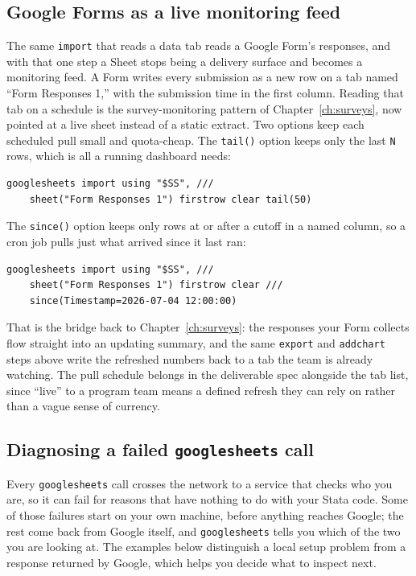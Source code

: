 \documentclass[
    a4paper,
    fontsize=10pt,
    twoside=true,
    numbers=noenddot,
]{kaobook}
\begin{document}
\subsection{Google Forms as a live monitoring feed}
The same \texttt{import} that reads a data tab reads a Google Form's responses, and with that one step a Sheet stops being a delivery surface and becomes a monitoring feed. A Form writes every submission as a new row on a tab named \enquote{Form Responses 1,} with the submission time in the first column. Reading that tab on a schedule is the survey-monitoring pattern of Chapter~\ref{ch:surveys}, now pointed at a live sheet instead of a static extract. Two options keep each scheduled pull small and quota-cheap. The \texttt{tail()} option keeps only the last \texttt{N} rows, which is all a running dashboard needs:
\par
{\footnotesize
\begin{verbatim}
googlesheets import using "$SS", ///
    sheet("Form Responses 1") firstrow clear tail(50)
\end{verbatim}
}
The \texttt{since()} option keeps only rows at or after a cutoff in a named column, so a cron job pulls just what arrived since it last ran:
\par
{\footnotesize
\begin{verbatim}
googlesheets import using "$SS", ///
    sheet("Form Responses 1") firstrow clear ///
    since(Timestamp=2026-07-04 12:00:00)
\end{verbatim}
}
That is the bridge back to Chapter~\ref{ch:surveys}: the responses your Form collects flow straight into an updating summary, and the same \texttt{export} and \texttt{addchart} steps above write the refreshed numbers back to a tab the team is already watching. The pull schedule belongs in the deliverable spec alongside the tab list, since \enquote{live} to a program team means a defined refresh they can rely on rather than a vague sense of currency.

\subsection{Diagnosing a failed \texttt{googlesheets} call}\label{sec:ch11-gs-failures}
Every \texttt{googlesheets} call crosses the network to a service that checks who you are, so it can fail for reasons that have nothing to do with your Stata code. Some of those failures start on your own machine, before anything reaches Google; the rest come back from Google itself, and \texttt{googlesheets} tells you which of the two you are looking at. The examples below distinguish a local setup problem from a response returned by Google, which helps you decide what to inspect next.
\end{document}
